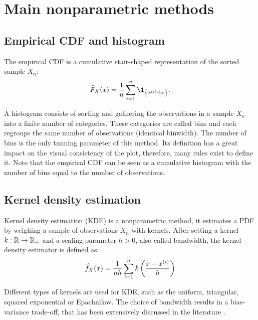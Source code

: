 \section{Main nonparametric methods}


\subsection*{Empirical CDF and histogram}
The empirical CDF is a cumulative stair-shaped representation of the sorted sample $X_n$:
\begin{equation}
    \what{F}_X(x) = \frac1n \sum_{i=1}^{n} \1_{\left\{x^{(i)} \leq x\right\}}.
\end{equation}

A histogram consists of sorting and gathering the observations in a sample $X_n$ into a finite number of categories. 
These categories are called bins and each regroups the same number of observations (identical binwidth). 
The number of bins is the only tunning parameter of this method. 
Its definition has a great impact on the visual consistency of the plot, therefore, many rules exist to define it.
Note that the empirical CDF can be seen as a cumulative histogram with the number of bins equal to the number of observations.


\subsection*{Kernel density estimation}
Kernel density estimation (KDE) is a nonparametric method, it estimates a PDF by weighing a sample of observations $X_n$ with kernels.  
After setting a kernel $k: \mathbb{R} \rightarrow \mathbb{R}_+$ and a scaling parameter $h>0$, also called bandwidth, the kernel density estimator is defined as:
\begin{equation}
    \widehat{f}_X(x) = \frac{1}{n h}\sum_{i=1}^{n} k\left(\frac{x - x^{(i)}}{h}\right)
\end{equation}

Different types of kernels are used for KDE, such as the uniform, triangular, squared exponential or Epachnikov. 
The choice of bandwidth results in a bias-variance trade-off, that has been extensively discussed in the literature \citep{wand_jones_1994_kde}.


